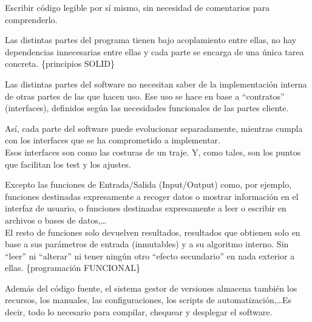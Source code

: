 \documentclass[spanish,10pt,a4paper,final,oneside]{article}
\begin{document}
Escribir código legible por sí mismo, sin necesidad de comentarios para comprenderlo.

\vspace{0.5cm}

Las distintas partes del programa tienen bajo acoplamiento entre ellas, no hay dependencias innecesarias entre ellas y cada parte se encarga de una única tarea concreta. \{principios SOLID\}

Las distintas partes del software no necesitan saber de la implementación interna de otras partes de las que hacen uso. Ese uso se hace en base a ``contratos'' (interfaces), definidos según las necesidades funcionales de las partes cliente.

Así, cada parte del software puede evolucionar separadamente, mientras cumpla con los interfaces que se ha comprometido a implementar.
\\Esos interfaces son como las costuras de un traje. Y, como tales, son los puntos que facilitan los test y los ajustes.

\vspace{0.5cm}

Excepto las funciones de Entrada/Salida (Input/Output) como, por ejemplo,  funciones destinadas expresamente a recoger datos o mostrar información en el interfaz de usuario, o funciones destinadas expresamente a leer o escribir en archivos o bases de datos,\ldots
\\El resto de funciones solo devuelven resultados, resultados que obtienen solo en base a sus parámetros de entrada (inmutables) y a su algoritmo interno. Sin ``leer'' ni ``alterar'' ni tener ningún otro ``efecto secundario'' en nada exterior a ellas.  \{programación FUNCIONAL\}

\vspace{2cm}

Además del código fuente, el sistema gestor de versiones almacena también los recursos, los manuales, las configuraciones, los scripts de automatización,\ldots Es decir, todo lo necesario para compilar, chequear y desplegar el software. 
\end{document}
